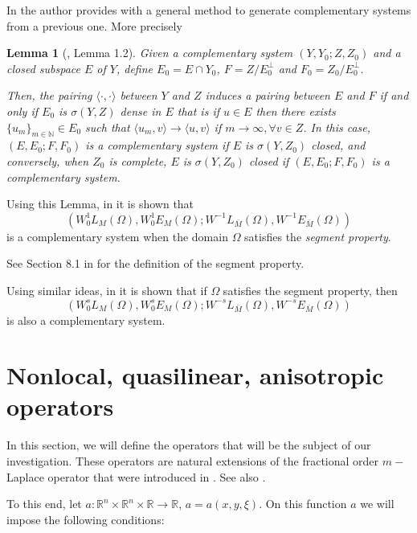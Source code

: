 \documentclass{amsart}
\newcommand{\R}{{\mathbb R}}
\newcommand{\N}{{\mathbb N}}
\newtheorem{lema}[teo]{Lemma}
\theoremstyle{remark}
\theoremstyle{definition}
\numberwithin{equation}{section}
\begin{document}
In \cite{Gossez} the author provides with a general method to generate complementary systems from a previous one. More precisely
\begin{lema}
	[\cite{Gossez}, Lemma 1.2]\label{lemaGossez}
Given a complementary system $(Y, Y_0; Z, Z_0)$ and a closed subspace $E$ of $Y$, define $E_0= E \cap Y_0$, $F = Z/E_0^\perp$ and $F_0 = Z_0/E_0^\perp$.

Then, the pairing $\langle\cdot,\cdot\rangle$ between $Y$ and $Z$ induces a pairing between $E$ and $F$ if and only if $E_0$ is $\sigma(Y,Z)$ dense in $E$ that is if $u\in E$ then there exists $\{u_m\}_{m\in\N}\in E_0$ such that $\langle u_m,v\rangle\to \langle u,v\rangle$ if $m\to \infty, \forall v\in Z$. In this case, $(E, E_0; F, F_0)$ is a complementary system if $E$ is $\sigma(Y, Z_0)$ closed, and conversely, when $Z_0$ is complete, $E$ is $\sigma(Y, Z_0)$ closed if $(E, E_0; F, F_0)$ is a complementary system.
\end{lema}

Using this Lemma, in \cite{Gossez} it is shown that 
$$
(W^1_0L_M(\Omega),W^1_0E_M(\Omega); W^{-1}L_{\bar M}(\Omega), W^{-1}E_{\bar M}(\Omega))
$$
is a complementary system when the domain $\Omega$ satisfies the {\em segment property}. 


See Section 8.1 in \cite{DB} for the definition of the segment property.

Using similar ideas, in \cite[Section 2.3]{FBSP}  it is shown that if $\Omega$ satisfies the segment property, then
\begin{equation}\label{CS}
(W^s_0L_M(\Omega),W^s_0E_M(\Omega); W^{-s}L_{\bar M}(\Omega), W^{-s}E_{\bar M}(\Omega))
\end{equation}
is also a complementary system.




\section{Nonlocal, quasilinear, anisotropic operators} \label{sec:operators}
In this section, we will define the operators that will be the subject of our investigation. These operators are natural extensions of the fractional order $m-$Laplace operator that were introduced in \cite{FBS}. See also \cite{FBSP}.

To this end, let $a\colon \R^n\times\R^n\times \R\to \R$, $a=a(x,y,\xi)$. On this function $a$ we will impose the following conditions:
\end{document}
